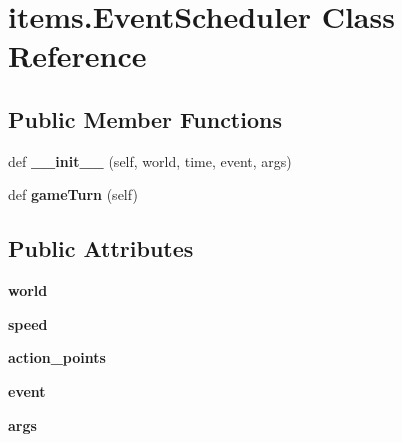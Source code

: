 \hypertarget{classitems_1_1_event_scheduler}{}\section{items.\+Event\+Scheduler Class Reference}
\label{classitems_1_1_event_scheduler}
\subsection*{Public Member Functions}
\begin{DoxyCompactItemize}
\item 
\hypertarget{classitems_1_1_event_scheduler_ae266e34bfb7338f66b78f6e50f1706d5}{}def {\bfseries \+\_\+\+\_\+init\+\_\+\+\_\+} (self, world, time, event, args)\label{classitems_1_1_event_scheduler_ae266e34bfb7338f66b78f6e50f1706d5}

\item 
\hypertarget{classitems_1_1_event_scheduler_ae4a7c820a30fae0e1cbde1246ce02585}{}def {\bfseries game\+Turn} (self)\label{classitems_1_1_event_scheduler_ae4a7c820a30fae0e1cbde1246ce02585}

\end{DoxyCompactItemize}
\subsection*{Public Attributes}
\begin{DoxyCompactItemize}
\item 
\hypertarget{classitems_1_1_event_scheduler_a518862098805b60af9e13b466887a825}{}{\bfseries world}\label{classitems_1_1_event_scheduler_a518862098805b60af9e13b466887a825}

\item 
\hypertarget{classitems_1_1_event_scheduler_aeb34e305ba1131a5a9224c474762408a}{}{\bfseries speed}\label{classitems_1_1_event_scheduler_aeb34e305ba1131a5a9224c474762408a}

\item 
\hypertarget{classitems_1_1_event_scheduler_ae1a96375a217e3c8f91e12dc1f5ce081}{}{\bfseries action\+\_\+points}\label{classitems_1_1_event_scheduler_ae1a96375a217e3c8f91e12dc1f5ce081}

\item 
\hypertarget{classitems_1_1_event_scheduler_a5e4f8d8918b231bdae6dc72707110c54}{}{\bfseries event}\label{classitems_1_1_event_scheduler_a5e4f8d8918b231bdae6dc72707110c54}

\item 
\hypertarget{classitems_1_1_event_scheduler_a8936883f6650dc9ea629f9e8ac9b089f}{}{\bfseries args}\label{classitems_1_1_event_scheduler_a8936883f6650dc9ea629f9e8ac9b089f}

\end{DoxyCompactItemize}



